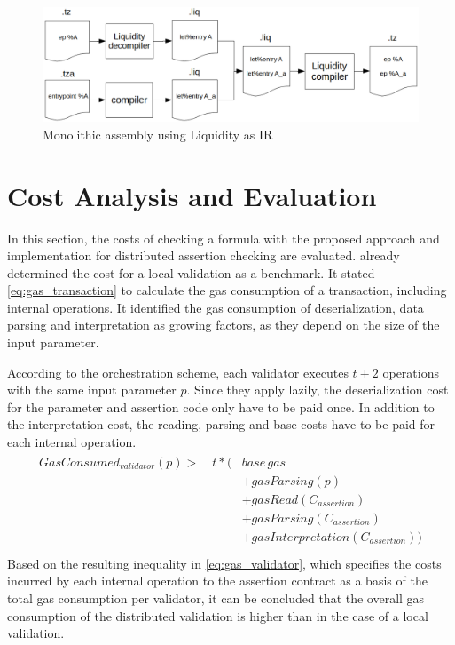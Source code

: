 \begin{figure}[t]
\centering
\includegraphics[width=\linewidth]{figures/5-offline_tezos/liquidity_assembly}
\caption{Monolithic assembly using Liquidity as IR}
\label{fig:liq_assembly}
\end{figure}

\section{Cost Analysis and Evaluation}\label{sec:cost_analysis_distributed}
In this section, the costs of checking a formula with the proposed approach and implementation for distributed assertion checking are evaluated.  already determined the cost for a local validation as a benchmark. It stated \eqref{eq:gas_transaction} to calculate the gas consumption of a transaction, including internal operations. It identified the gas consumption of deserialization, data parsing and interpretation as growing factors, as they depend on the size of the input parameter.

According to the orchestration scheme, each validator executes $t+2$ operations with the same input parameter $p$. Since they apply lazily, the deserialization cost for the parameter and assertion code only have to be paid once. In addition to the interpretation cost, the reading, parsing and base costs have to be paid for each internal operation. 
\begin{align}\label{eq:gas_validator}
\begin{split}
GasConsumed_{validator}(p) > \quad t * (&base\, gas \\
&+ gasParsing(p) \\
&+ gasRead(C_{assertion}) \\
&+ gasParsing(C_{assertion}) \\
&+ gasInterpretation(C_{assertion})) \\
\end{split}
\end{align}
Based on the resulting inequality in \eqref{eq:gas_validator}, which specifies the costs incurred by each internal operation to the assertion contract as a basis of the total gas consumption per validator, it can be concluded that the overall gas consumption of the distributed validation is higher than in the case of a local validation.

